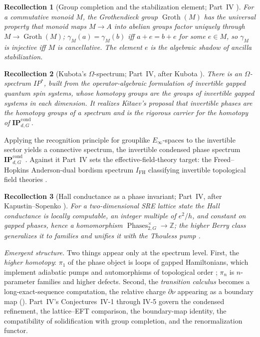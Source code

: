 \documentclass[12pt]{article}
\newcommand{\Phases}{\operatorname{Phases}}    %
\newcommand{\IPcond}{\mathbf{IP}^{\mathrm{cond}}}  %
\newcommand{\rc}{\partial\nu}                   %
\newcommand{\ZZ}{\mathbb{Z}}
\newcommand{\Groth}{\operatorname{Groth}}      %
\newcommand{\IFH}{I_{\mathrm{FH}}}             %
\theoremstyle{plain}
\newtheorem{recollection}[recollection]{Recollection}
\theoremstyle{definition}
\theoremstyle{remark}
\begin{document}
\begin{recollection}[Group completion and the stabilization element; Part~IV \cite{paperEFT}]
\label{rec:groth}
For a commutative monoid $M$, the Grothendieck group $\Groth(M)$ has the universal
property that monoid maps $M\to A$ into abelian groups factor uniquely through
$M\to\Groth(M)$; $\gamma_M(a)=\gamma_M(b)$ iff $a+e=b+e$ for some $e\in M$, so
$\gamma_M$ is injective iff $M$ is cancellative. The element $e$ is the algebraic shadow
of ancilla stabilization.
\end{recollection}

\begin{recollection}[Kubota's $\Omega$-spectrum; Part~IV, after Kubota \cite{kubota-omega-spectrum,paperEFT}]
\label{rec:kubota}
There is an $\Omega$-spectrum $\mathit{IP}^\ast$, built from the operator-algebraic
formulation of invertible gapped quantum spin systems, whose homotopy groups are the
groups of invertible gapped systems in each dimension. It realizes Kitaev's proposal
\cite{kitaev-periodic-table} that invertible phases are the homotopy groups of a
spectrum and is the rigorous carrier for the homotopy of $\IPcond_{d,G}$.
\end{recollection}

Applying the recognition principle for grouplike $E_\infty$-spaces to the invertible
sector yields a connective spectrum, the invertible condensed phase spectrum
$\IPcond_{d,G}$ \cite{beaudry-etal}. Against it Part~IV sets the effective-field-theory
target: the Freed--Hopkins Anderson-dual bordism spectrum $\IFH$ classifying invertible
topological field theories \cite{freed-hopkins,freed-sre}.

\begin{recollection}[Hall conductance as a phase invariant; Part~IV, after Kapustin--Sopenko \cite{kapustin-sopenko-hall,kapustin-sopenko-noether,paperEFT}]
\label{rec:hall}
For a two-dimensional SRE lattice state the Hall conductance is locally computable, an
integer multiple of $e^2/h$, and constant on gapped phases, hence a homomorphism
$\Phases_{2,G}^\times\to\ZZ$; the higher Berry class generalizes it to families and
unifies it with the Thouless pump \cite{thouless-pump}.
\end{recollection}

\emph{Emergent structure.} Two things appear only at the spectrum level. First, the
\emph{higher homotopy}: $\pi_1$ of the phase object is loops of gapped Hamiltonians,
which implement adiabatic pumps and automorphisms of topological order
\cite{aasen-wang-hastings}; $\pi_n$ is $n$-parameter families and higher defects.
Second, the \emph{transition calculus} becomes a long-exact-sequence computation, the
relative charge $\rc$ appearing as a boundary map (). Part~IV's
Conjectures~IV-1 through IV-5 govern the condensed refinement, the lattice--EFT
comparison, the boundary-map identity, the compatibility of solidification with group
completion, and the renormalization functor.
\end{document}

